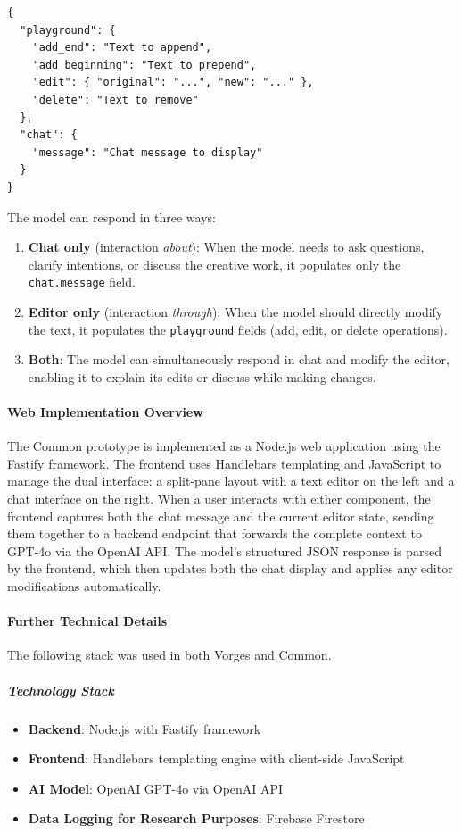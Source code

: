 \begin{verbatim}
{
  "playground": {
    "add_end": "Text to append",
    "add_beginning": "Text to prepend",
    "edit": { "original": "...", "new": "..." },
    "delete": "Text to remove"
  },
  "chat": {
    "message": "Chat message to display"
  }
}
\end{verbatim}

The model can respond in three ways:
\begin{enumerate}
    \item \textbf{Chat only} (interaction \textit{about}): When the model needs to ask questions, clarify intentions, or discuss the creative work, it populates only the \texttt{chat.message} field.
    \item \textbf{Editor only} (interaction \textit{through}): When the model should directly modify the text, it populates the \texttt{playground} fields (add, edit, or delete operations).
    \item \textbf{Both}: The model can simultaneously respond in chat and modify the editor, enabling it to explain its edits or discuss while making changes.
\end{enumerate}


\paragraph{Web Implementation Overview}

The Common prototype is implemented as a Node.js web application using the Fastify framework. The frontend uses Handlebars templating and JavaScript to manage the dual interface: a split-pane layout with a text editor on the left and a chat interface on the right. When a user interacts with either component, the frontend captures both the chat message and the current editor state, sending them together to a backend endpoint that forwards the complete context to GPT-4o via the OpenAI API. The model's structured JSON response is parsed by the frontend, which then updates both the chat display and applies any editor modifications automatically.

\paragraph{Further Technical Details}

The following stack was used in both Vorges and Common. 

\subparagraph{Technology Stack}

\begin{itemize}
    \item \textbf{Backend}: Node.js with Fastify framework
    \item \textbf{Frontend}: Handlebars templating engine with client-side JavaScript
    \item \textbf{AI Model}: OpenAI GPT-4o via OpenAI API
    \item \textbf{Data Logging for Research Purposes}: Firebase Firestore 

\end{itemize}



 




